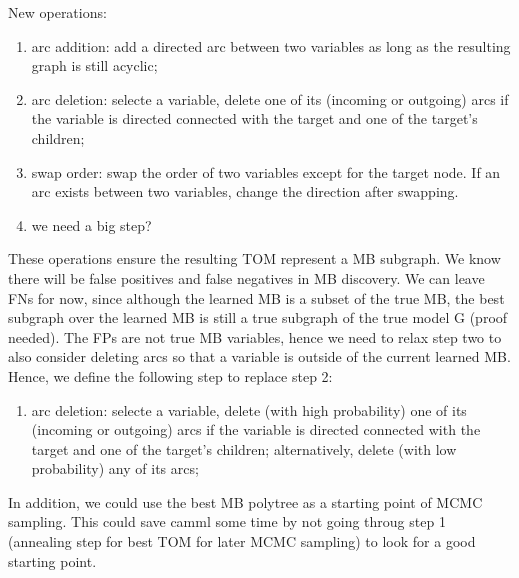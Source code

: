 New operations: 
\begin{enumerate}
\item arc addition: add a directed arc between two variables as long as the resulting graph is still acyclic; 
\item arc deletion: selecte a variable, delete one of its (incoming or outgoing) arcs if the variable is directed connected with the target and one of the target's children;
\item swap order: swap the order of two variables except for the target node. If an arc exists between two variables, change the direction after swapping. 
\item we need a big step?
\end{enumerate}
These operations ensure the resulting TOM represent a MB subgraph. We know there will be false positives and false negatives in MB discovery. We can leave FNs for now, since although the learned MB is a subset of the true MB, the best subgraph over the learned MB is still a true subgraph of the true model G (proof needed). The FPs are not true MB variables, hence we need to relax step two to also consider deleting arcs so that a variable is outside of the current learned MB. Hence, we define the following step to replace step 2:
\begin{enumerate}[label=2*.]
\item arc deletion: selecte a variable, delete (with high probability) one of its (incoming or outgoing) arcs if the variable is directed connected with the target and one of the target's children; alternatively, delete (with low probability) any of its arcs;
\end{enumerate}

In addition, we could use the best MB polytree as a starting point of MCMC sampling. This could save camml some time by not going throug step 1 (annealing step for best TOM for later MCMC sampling) to look for a good starting point. 




